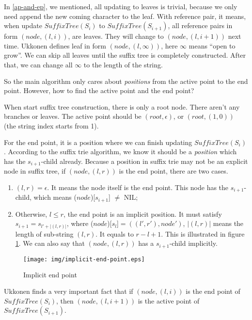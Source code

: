 \documentclass{article}
\begin{document}
In \ref{ap-and-ep}, we mentioned, all updating to leaves is trivial, because we
only need append the new coming character to the leaf. With reference pair,
it means, when update $SuffixTree(S_i)$ to $SuffixTree(S_{i+1})$,
all reference pairs in form $(node, (l, i))$, are leaves. They will
change to $(node, (l, i+1))$ next time. Ukkonen defines leaf in form
$(node, (l, \infty))$, here $\infty$ means ``open to grow''. We can skip all
leaves until the suffix tree is completely constructed. After that, we can
change all $\infty$ to the length of the string.

So the main algorithm only cares about {\em positions} from the active point
to the end point. However, how to find the active point and the end point?

When start suffix tree construction, there is only a root node. There aren't
any branches or leaves. The active point should be $(root, \epsilon)$, or
$(root, (1, 0))$ (the string index starts from 1).

For the end point, it is a position where we can finish updating $SuffixTree(S_i)$.
According to the suffix trie algorithm, we know it should be a
{\em position} which has the $s_{i+1}$-child already. Because a position
in suffix trie may not be an explicit node in suffix tree, if $(node, (l, r))$
is the end point, there are two cases.

\begin{enumerate}
\item $(l, r)=\epsilon$. It means the node itself is the end point. This node has the
$s_{i+1}$-child, which means ($node$)[$s_{i+1}$] $\neq$ NIL;
\item Otherwise, $l \leq r$, the end point is an implicit position.
It must satisfy $s_{i+1}=s_{l'+|(l, r)|}$, where
($node$)[$s_l$]$=((l', r'), node')$, $|(l, r)|$ means
the length of sub-string $(l, r)$. It equals to $r-l+1$.
This is illustrated in figure \ref{fig:implicit-end-point}. We can
also say that $(node, (l, r))$ has a $s_{i+1}$-child implicitly.
\end{enumerate}

\begin{figure}[htbp]
  \centering
  \texttt{[image: img/implicit-end-point.eps]}
  \caption{Implicit end point}
  \label{fig:implicit-end-point}
\end{figure}

Ukkonen finds a very important fact that if $(node, (l, i))$ is the end
point of $SuffixTree(S_i)$, then $(node, (l, i+1))$ is the active point of
$SuffixTree(S_{i+1})$.
\end{document}
